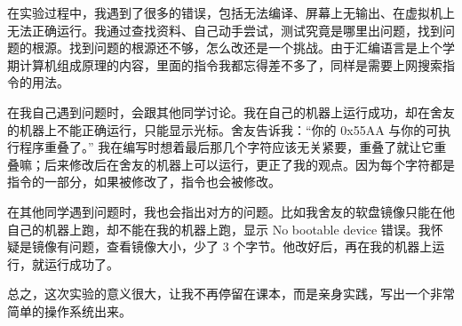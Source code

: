\documentclass{article}
\begin{document}
在实验过程中，我遇到了很多的错误，包括无法编译、屏幕上无输出、在虚拟机上无法正确运行。我通过查找资料、自己动手尝试，测试究竟是哪里出问题，找到问题的根源。找到问题的根源还不够，怎么改还是一个挑战。由于汇编语言是上个学期计算机组成原理的内容，里面的指令我都忘得差不多了，同样是需要上网搜索指令的用法。

在我自己遇到问题时，会跟其他同学讨论。我在自己的机器上运行成功，却在舍友的机器上不能正确运行，只能显示光标。舍友告诉我：“你的 0x55AA 与你的可执行程序重叠了。” 我在编写时想着最后那几个字符应该无关紧要，重叠了就让它重叠嘛；后来修改后在舍友的机器上可以运行，更正了我的观点。因为每个字符都是指令的一部分，如果被修改了，指令也会被修改。

在其他同学遇到问题时，我也会指出对方的问题。比如我舍友的软盘镜像只能在他自己的机器上跑，却不能在我的机器上跑，显示 No bootable device 错误。我怀疑是镜像有问题，查看镜像大小，少了 3 个字节。他改好后，再在我的机器上运行，就运行成功了。

总之，这次实验的意义很大，让我不再停留在课本，而是亲身实践，写出一个非常简单的操作系统出来。
\end{document}
